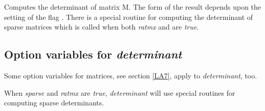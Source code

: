 \documentclass[../Maxima_Workbook.tex]{subfiles}
\begin{document}
\lz {} \hfill \tcr{[function]}

\lz Computes the determinant of matrix M. The form of the result depends upon the setting of the flag . There is a special routine for computing the determinant of sparse matrices which is called when both \emph{ratmx} and  are \emph{true}.

\subsection{Option variables for \emph{determinant}}

Some option variables for matrices, see section \ref{LA7}, apply to \emph{determinant}, too.

\lzz {} \qquad {} \hfill {}

\lz When \emph{sparse} and \emph{ratmx} are \emph{true}, \emph{determinant} will use special routines for computing sparse determinants.
\end{document}
